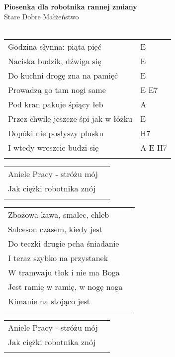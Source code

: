 \documentclass[a5paper]{article}
\begin{document}


\noindent
\fontsize{12pt}{15pt}\selectfont
\textbf{Piosenka dla robotnika rannej zmiany} \\
\fontsize{8pt}{10pt}\selectfont
Stare Dobre Małżeństwo \\ \\
\fontsize{10pt}{12pt}\selectfont
{}
\begin{tabular}{@{}p{7.50cm}p{3cm}@{}}
\noindent
Godzina słynna: piąta pięć & E \\
Naciska budzik, dźwiga się & E \\
Do kuchni drogę zna na pamięć & E \\
Prowadzą go tam nogi same & E E7 \\
Pod kran pakuje śpiący łeb & A \\
Przez chwilę jeszcze śpi jak w łóżku & E \\
Dopóki nie posłyszy plusku & H7 \\
I wtedy wreszcie budzi się & A E H7 \\ \\
\end{tabular}

\noindent
\begin{tabular}{@{}p{6.50cm}p{3cm}@{}}
Aniele Pracy - stróżu mój \\
Jak ciężki robotnika znój \\ \\
\end{tabular}

\noindent
\begin{tabular}{@{}p{6.50cm}p{3cm}@{}}
Zbożowa kawa, smalec, chleb \\
Salceson czasem, kiedy jest \\
Do teczki drugie pcha śniadanie \\
I teraz szybko na przystanek \\
W tramwaju tłok i nie ma Boga \\
Jest ramię w ramię, w nogę noga \\
Kimanie na stojąco jest \\ \\
\end{tabular}

\noindent
\begin{tabular}{@{}p{6.50cm}p{3cm}@{}}
Aniele Pracy - stróżu mój \\
Jak ciężki robotnika znój \\ \\
\end{tabular}
\end{document}

